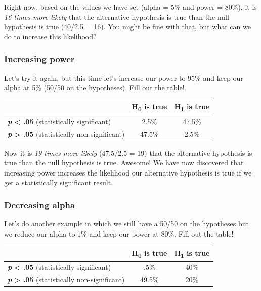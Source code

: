 \documentclass[
]{book}
\begin{document}
Right now, based on the values we have set (alpha = 5\% and power = 80\%), it is \emph{16 times more likely} that the alternative hypothesis is true than the null hypothesis is true (40/2.5 = 16). You might be fine with that, but what can we do to increase this likelihood?

\hypertarget{increasing-power}{%
\subsubsection{Increasing power}\label{increasing-power}}

Let's try it again, but this time let's increase our power to 95\% and keep our alpha at 5\% (50/50 on the hypotheses). Fill out the table!

\begin{longtable}[]{@{}lcc@{}}
\toprule
& H\textsubscript{0} is true & H\textsubscript{1} is true \\
\midrule
\endhead
\textbf{\emph{p}} \textbf{\textless{} .05} (statistically significant) & 2.5\% & 47.5\% \\
\textbf{\emph{p}} \textbf{\textgreater{} .05} (statistically non-significant) & 47.5\% & 2.5\% \\
\bottomrule
\end{longtable}

Now it is \emph{19 times more likely} (47.5/2.5 = 19) that the alternative hypothesis is true than the null hypothesis is true. Awesome! We have now discovered that increasing power increases the likelihood our alternative hypothesis is true if we get a statistically significant result.

\hypertarget{decreasing-alpha}{%
\subsubsection{Decreasing alpha}\label{decreasing-alpha}}

Let's do another example in which we still have a 50/50 on the hypotheses but we reduce our alpha to 1\% and keep our power at 80\%. Fill out the table!

\begin{longtable}[]{@{}lcc@{}}
\toprule
& H\textsubscript{0} is true & H\textsubscript{1} is true \\
\midrule
\endhead
\textbf{\emph{p}} \textbf{\textless{} .05} (statistically significant) & .5\% & 40\% \\
\textbf{\emph{p}} \textbf{\textgreater{} .05} (statistically non-significant) & 49.5\% & 20\% \\
\bottomrule
\end{longtable}
\end{document}
